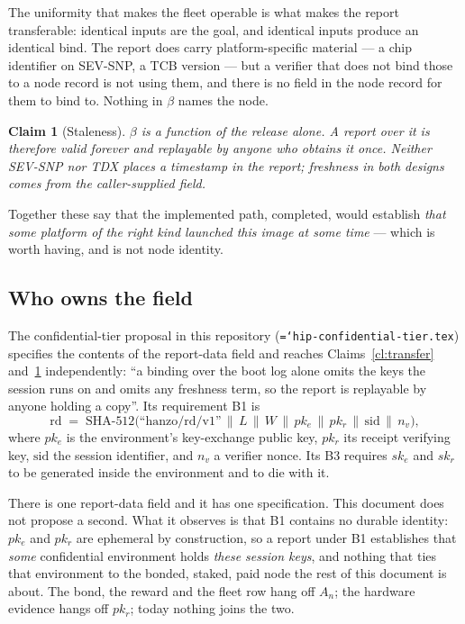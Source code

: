 \documentclass[11pt,a4paper]{article}
\newtheorem{claim}[definition]{Claim}
\newcommand{\code}[1]{\texttt{\hyphenchar\font=`\-\relax #1}}
\newcommand{\sha}[1]{\mathrm{SHA\text{-}#1}}
\begin{document}
\noindent The uniformity that makes the fleet operable is what makes the report
transferable: identical inputs are the goal, and identical inputs produce an
identical bind. The report does carry platform-specific material --- a chip
identifier on SEV-SNP, a TCB version --- but a verifier that does not bind those
to a node record is not using them, and there is no field in the node record for
them to bind to. Nothing in $\beta$ names the node.

\begin{claim}[Staleness]\label{cl:stale}
$\beta$ is a function of the release alone. A report over it is therefore valid
forever and replayable by anyone who obtains it once. Neither SEV-SNP nor TDX
places a timestamp in the report; freshness in both designs comes from the
caller-supplied field.
\end{claim}

Together these say that the implemented path, completed, would establish
\emph{that some platform of the right kind launched this image at some time} ---
which is worth having, and is not node identity.

\subsection{Who owns the field}
\label{sec:field}

The confidential-tier proposal in this repository
(\code{hip-confidential-tier.tex}) specifies the contents of the report-data field
and reaches Claims~\ref{cl:transfer} and~\ref{cl:stale} independently: ``a binding
over the boot log alone omits the keys the session runs on and omits any freshness
term, so the report is replayable by anyone holding a copy''. Its requirement B1
is
\[
\mathrm{rd} \;=\; \sha{512}\bigl(\text{``hanzo/rd/v1''} \,\|\, L \,\|\, W \,\|\,
pk_e \,\|\, pk_r \,\|\, \mathrm{sid} \,\|\, n_v \bigr),
\]
where $pk_e$ is the environment's key-exchange public key, $pk_r$ its receipt
verifying key, $\mathrm{sid}$ the session identifier, and $n_v$ a verifier nonce.
Its B3 requires $sk_e$ and $sk_r$ to be generated inside the environment and to
die with it.

There is one report-data field and it has one specification. This document does
not propose a second. What it observes is that B1 contains no durable identity:
$pk_e$ and $pk_r$ are ephemeral by construction, so a report under B1 establishes
that \emph{some} confidential environment holds \emph{these session keys}, and
nothing that ties that environment to the bonded, staked, paid node the rest of
this document is about. The bond, the reward and the fleet row hang off $A_n$; the
hardware evidence hangs off $pk_r$; today nothing joins the two.
\end{document}

